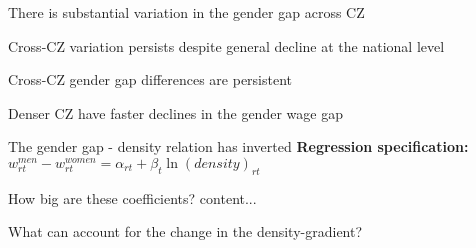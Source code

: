 \begin{frame}{There is substantial variation in the gender gap across CZ} 

\end{frame}
\begin{frame}{Cross-CZ variation persists despite general decline at the national level}
\end{frame}
\begin{frame}{Cross-CZ gender gap differences are persistent}
\end{frame}
\begin{frame}{Denser CZ have faster declines in the gender wage gap}
	
\end{frame}
\begin{frame}{The gender gap - density relation has inverted}  
	\textbf{\alert{Regression specification:}}	$w^{men}_{rt}-w^{women}_{rt}=\alpha_{rt}+\beta_{t}\ln(density)_{rt}$
	
\end{frame}
\begin{frame}{How big are these coefficients?}  
	content...
\end{frame}
\begin{frame}{What can account for the change in the density-gradient?}
	
\end{frame}
